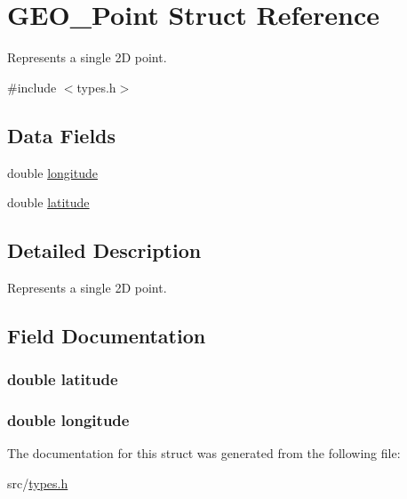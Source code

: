 \hypertarget{struct_g_e_o___point}{}\section{G\+E\+O\+\_\+\+Point Struct Reference}
\label{struct_g_e_o___point}


Represents a single 2D point.  




{\ttfamily \#include $<$types.\+h$>$}

\subsection*{Data Fields}
\begin{DoxyCompactItemize}
\item 
double \hyperlink{struct_g_e_o___point_ac155e35fdeebafc89723a51520fb9fe6}{longitude}
\item 
double \hyperlink{struct_g_e_o___point_a76714bdbc5c536fa77dfb14533ff82a9}{latitude}
\end{DoxyCompactItemize}


\subsection{Detailed Description}
Represents a single 2D point. 

\subsection{Field Documentation}
\subsubsection[{\texorpdfstring{latitude}{latitude}}]{\setlength{\rightskip}{0pt plus 5cm}double latitude}\hypertarget{struct_g_e_o___point_a76714bdbc5c536fa77dfb14533ff82a9}{}\label{struct_g_e_o___point_a76714bdbc5c536fa77dfb14533ff82a9}
\subsubsection[{\texorpdfstring{longitude}{longitude}}]{\setlength{\rightskip}{0pt plus 5cm}double longitude}\hypertarget{struct_g_e_o___point_ac155e35fdeebafc89723a51520fb9fe6}{}\label{struct_g_e_o___point_ac155e35fdeebafc89723a51520fb9fe6}


The documentation for this struct was generated from the following file\+:\begin{DoxyCompactItemize}
\item 
src/\hyperlink{types_8h}{types.\+h}\end{DoxyCompactItemize}
